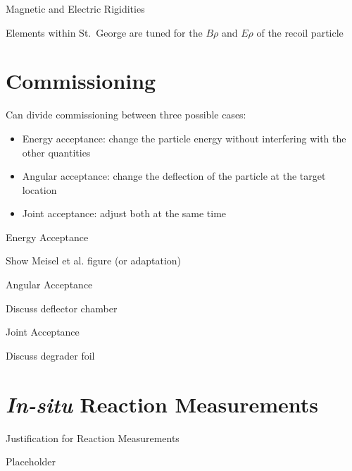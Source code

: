 \documentclass[10pt]{beamer}
\begin{document}
\begin{frame}{Magnetic and Electric Rigidities}

    Elements within St.\ George are tuned for the $B\rho$ and $E\rho$ of
    the recoil particle

\end{frame}

\section{Commissioning}

\begin{frame}

    Can divide commissioning between three possible cases:
    \begin{itemize}
        \item Energy acceptance: change the particle energy without
            interfering with the other quantities
        \item Angular acceptance: change the deflection of the particle
            at the target location
        \item Joint acceptance: adjust both at the same time
    \end{itemize}

\end{frame}

\begin{frame}{Energy Acceptance}

    Show Meisel et al. figure (or adaptation)

\end{frame}

\begin{frame}{Angular Acceptance}

    Discuss deflector chamber

\end{frame}

\begin{frame}{Joint Acceptance}

    Discuss degrader foil

\end{frame}

\section{\textit{In-situ} Reaction Measurements}

\begin{frame}{Justification for Reaction Measurements}

    Placeholder

\end{frame}
\end{document}
